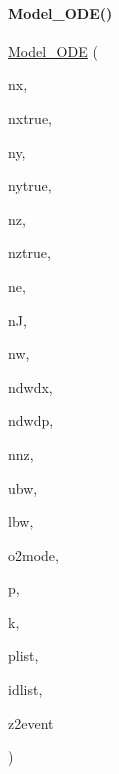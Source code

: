 \paragraph{\texorpdfstring{Model\+\_\+\+O\+D\+E()}{Model\_ODE()}\hspace{0.1cm}{\footnotesize\ttfamily [2/2]}}
{\footnotesize\ttfamily \mbox{\hyperlink{classamici_1_1_model___o_d_e}{Model\+\_\+\+O\+DE}} (\begin{DoxyParamCaption}\item[{const int}]{nx,  }\item[{const int}]{nxtrue,  }\item[{const int}]{ny,  }\item[{const int}]{nytrue,  }\item[{const int}]{nz,  }\item[{const int}]{nztrue,  }\item[{const int}]{ne,  }\item[{const int}]{nJ,  }\item[{const int}]{nw,  }\item[{const int}]{ndwdx,  }\item[{const int}]{ndwdp,  }\item[{const int}]{nnz,  }\item[{const int}]{ubw,  }\item[{const int}]{lbw,  }\item[{const \mbox{\hyperlink{namespaceamici_a2d77779286167d5603a870bf9f6c21ba}{Second\+Order\+Mode}}}]{o2mode,  }\item[{const std\+::vector$<$ \mbox{\hyperlink{namespaceamici_a1bdce28051d6a53868f7ccbf5f2c14a3}{realtype}} $>$}]{p,  }\item[{const std\+::vector$<$ \mbox{\hyperlink{namespaceamici_a1bdce28051d6a53868f7ccbf5f2c14a3}{realtype}} $>$}]{k,  }\item[{const std\+::vector$<$ int $>$}]{plist,  }\item[{const std\+::vector$<$ \mbox{\hyperlink{namespaceamici_a1bdce28051d6a53868f7ccbf5f2c14a3}{realtype}} $>$}]{idlist,  }\item[{const std\+::vector$<$ int $>$}]{z2event }\end{DoxyParamCaption})}

